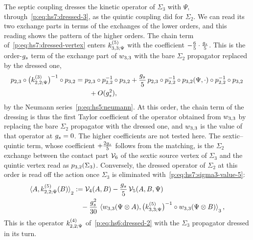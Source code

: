 The septic coupling dresses the kinetic operator of $\Sigma_3$ with $\Psi$, through~\eqref{p:eq:hs7:dressed-3}, as the quintic coupling did for $\Sigma_2$.
We can read its two exchange parts in terms of the exchanges of the lower orders, and this reading shows the pattern of the higher orders.
The chain term of~\eqref{p:eq:hs7:dressed-vertex} enters $\kin{3}{\Psi}{5}$ with the coefficient $- \tfrac{6}{5} \cdot \tfrac{g_s}{5}$.
This is the order-$g_s$ term of the exchange part of $w_{3,3}$ with the bare $\Sigma_2$ propagator replaced by the dressed one,
\begin{equation}
  \label{p:eq:hs7:running}
  \begin{aligned}
    \sprod{2}{3} \circ \big( \kin{2}{\Psi}{3} \big)^{-1} \circ \sprod{3}{2}
      &
      = \sprod{2}{3} \circ \sprod{2}{2}^{-1} \circ \sprod{3}{2}
        + \frac{\gs}{5} \, \sprod{2}{3} \circ \sprod{2}{2}^{-1} \circ \sprod{3}{2}(\Psi, \cdot) \circ \sprod{2}{2}^{-1} \circ \sprod{3}{2}
        \\ & \qquad
        + O(\gs^2),
  \end{aligned}
\end{equation}
by the Neumann series~\eqref{p:eq:hs5:neumann}.
At this order, the chain term of the dressing is thus the first Taylor coefficient of the operator obtained from $w_{3,3}$ by replacing the bare $\Sigma_2$ propagator with the dressed one, and $w_{3,3}$ is the value of that operator at $g_s = 0$.
The higher coefficients are not tested here.
The sextic--quintic term, whose coefficient $+ \tfrac{2 g_s}{5}$ follows from the matching, is the $\Sigma_2$ exchange between the contact part $\mathcal{V}_{6}$ of the sextic source vertex of $\Sigma_3$ and the quintic vertex read as $p_{3,2}(\Sigma_3)$.
Conversely, the dressed operator of $\Sigma_2$ at this order is read off the action once $\Sigma_3$ is eliminated with~\eqref{p:eq:hs7:sigma3-value-5}:
\begin{equation}
  \label{p:eq:hs7:dressed-2}
  \begin{aligned}
    \pair[2]{A}{\kin{2}{\Psi}{5}(B)}
      &
      := \vertex{4}(A, B)
        - \frac{\gs}{5} \, \vertex{5}(A, B, \Psi)
      \\ &
      \quad
      - \frac{\gs^2}{30} \, \pair[3]{\wprod{3}{3}(\Psi \otimes A)}{\big( \kin{3}{\Psi}{5} \big)^{-1} \circ \wprod{3}{3}(\Psi \otimes B)},
  \end{aligned}
\end{equation}
This is the operator $\kin{2}{\Psi}{4}$ of~\eqref{p:eq:hs6:dressed-2} with the $\Sigma_3$ propagator dressed in its turn.
